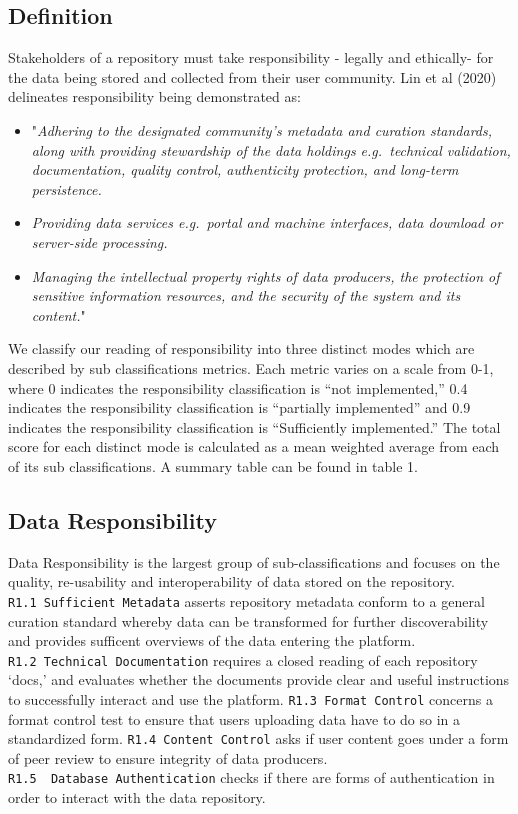 \documentclass{article}
\begin{document}
\hypertarget{definition}{%
\subsection{Definition}\label{definition}}

Stakeholders of a repository must take responsibility - legally and
ethically- for the data being stored and collected from their user
community. Lin et al (2020) delineates responsibility being demonstrated
as:

\begin{itemize}
\item
  "\emph{Adhering to the designated community's metadata and curation
  standards, along with providing stewardship of the data holdings
  e.g.~technical validation, documentation, quality control,
  authenticity protection, and long-term persistence.}
\item
  \emph{Providing data services e.g.~portal and machine interfaces, data
  download or server-side processing.}
\item
  \emph{Managing the intellectual property rights of data producers, the
  protection of sensitive information resources, and the security of the
  system and its content.}"
\end{itemize}

We classify our reading of responsibility into three distinct modes
which are described by sub classifications metrics. Each metric varies
on a scale from 0-1, where 0 indicates the responsibility classification
is ``not implemented,'' 0.4 indicates the responsibility classification
is ``partially implemented'' and 0.9 indicates the responsibility
classification is ``Sufficiently implemented.'' The total score for each
distinct mode is calculated as a mean weighted average from each of its
sub classifications. A summary table can be found in table 1.

\hypertarget{data-responsibility}{%
\subsection{Data Responsibility}\label{data-responsibility}}

Data Responsibility is the largest group of sub-classifications and
focuses on the quality, re-usability and interoperability of data stored
on the repository. \texttt{R1.1\ Sufficient\ Metadata} asserts
repository metadata conform to a general curation standard whereby data
can be transformed for further discoverability and provides sufficent
overviews of the data entering the platform.
\texttt{R1.2\ Technical\ Documentation} requires a closed reading of
each repository `docs,' and evaluates whether the documents provide
clear and useful instructions to successfully interact and use the
platform. \texttt{R1.3\ Format\ Control} concerns a format control test
to ensure that users uploading data have to do so in a standardized
form. \texttt{R1.4\ Content\ Control} asks if user content goes under a
form of peer review to ensure integrity of data producers.
\texttt{R1.5\ \ Database\ Authentication} checks if there are forms of
authentication in order to interact with the data repository.
\end{document}
